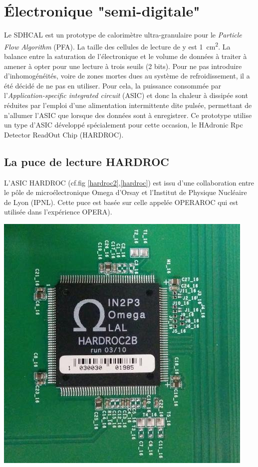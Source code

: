 \section{Électronique "semi-digitale"}
Le SDHCAL est un prototype de calorimètre ultra-granulaire pour le \textit{Particle Flow Algorithm} (PFA). La taille des cellules de lecture de y est  \SI{1}{\square\centi\meter}. La balance entre la saturation de l'électronique et le volume de données à traiter à amener à opter pour une lecture à trois seuils (\num{2} bits). Pour ne pas introduire d'inhomogénéités, voire de zones mortes dues au système de refroidissement, il a été décidé de ne pas en utiliser. Pour cela, la puissance consommée par l'\textit{Application-specific integrated circuit} (ASIC) et donc la chaleur à dissipée sont réduites par l'emploi d'une alimentation intermittente dite pulsée, permettant de n'allumer l'ASIC que lorsque des données sont à enregistrer. Ce prototype utilise un type d'ASIC développé spécialement pour cette occasion, le HAdronic Rpc Detector ReadOut Chip (HARDROC)\cite{Dulucq:2010ssa}.

\subsection{La puce de lecture HARDROC}
L'ASIC HARDROC (cf.fig \ref{hardroc2},\ref{hardroc}) est issu d'une collaboration entre le pôle de microélectronique Omega d'Orsay et l'Institut de Physique Nucléaire de Lyon (IPNL). Cette puce est basée sur celle appelée OPERAROC qui est utilisée dans l'expérience OPERA).

\marginpar
{
	\centering
	\includegraphics[width=\marginparwidth]{GLA/hardroc2.jpg}
	\label{hardroc2}
}

